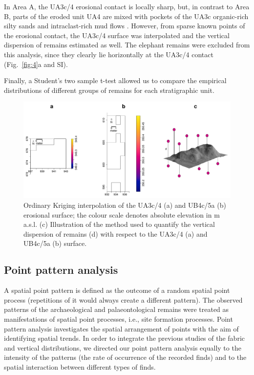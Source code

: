 \documentclass[preprint,authoryear,times]{elsarticle} %
\begin{document}
In Area A, the UA3c/4 erosional contact is locally sharp, but, in contrast to Area B, parts of the eroded unit UA4 are mixed with pockets of the UA3c organic-rich silty sands and intraclast-rich mud flows \citep{Karkanas}. However, from sparse known points of the erosional contact, the UA3c/4 surface was interpolated and the vertical dispersion of remains estimated as well. The elephant remains were excluded from this analysis, since they clearly lie horizontally at the UA3c/4 contact (Fig.~\ref{fig:4}a and SI). %

Finally, a Student's two sample t-test allowed us to compare the empirical distributions of different groups of remains for each stratigraphic unit.

\begin{figure}[]
  \centering
  \includegraphics[width=1\textwidth]{../artwork/Fig5.pdf}
  \caption{Ordinary Kriging interpolation of the UA3c/4 (a) and UB4c/5a (b) erosional surface; the colour scale denotes absolute elevation in m a.s.l. (c) Illustration of the method used to quantify the vertical dispersion of remains (d) with respect to the UA3c/4 (a) and UB4c/5a (b) surface.}
  \label{fig:5}
\end{figure}

\subsection{Point pattern analysis}

A spatial point pattern is defined as the outcome of a random spatial point process (repetitions of it would always create a different pattern). The observed patterns of the archaeological and palaeontological remains were treated as manifestations of spatial point processes, i.e., site formation processes. Point pattern analysis investigates the spatial arrangement of points with the aim of identifying spatial trends. In order to integrate the previous studies of the fabric and vertical distributions, we directed our point pattern analysis equally to the intensity of the patterns (the rate of occurrence of the recorded finds) and to the spatial interaction between different types of finds.
\end{document}
